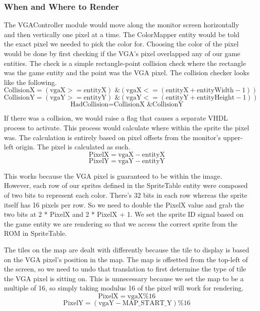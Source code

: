 \documentclass[10pt,a4paper]{article}
\begin{document}
\subsubsection{When and Where to Render}
The VGAController module would move along the monitor screen horizontally and then vertically one pixel at a time. The ColorMapper entity would be told the exact pixel we needed to pick the color for. Choosing the color of the pixel would be done by first checking if the VGA's pixel overlapped any of our game entities. The check is a simple rectangle-point collision check where the rectangle was the game entity and the point was the VGA pixel. The collision checker looks like the following.
\[ \mbox{CollisionX} = (\mbox{vgaX} >= \mbox{entityX}) \mbox{ \& } (\mbox{vgaX} <= (\mbox{entityX} + \mbox{entityWidth} - 1)) \]
\[ \mbox{CollisionY} = (\mbox{vgaY} >= \mbox{entityY}) \mbox{ \& } (\mbox{vgaY} <= (\mbox{entityY} + \mbox{entityHeight} - 1)) \]
\[ \mbox{HadCollision} = \mbox{CollisionX} \mbox{ \& } \mbox{CollisionY} \]

If there was a collision, we would raise a flag that causes a separate VHDL process to activate. This process would calculate where within the sprite the pixel was. The calculation is entirely based on pixel offsets from the monitor's upper-left origin. The pixel is calculated as such.
\[ \mbox{PixelX} = \mbox{vgaX} - \mbox{entityX} \]
\[ \mbox{PixelY} = \mbox{vgaY} - \mbox{entityY} \]

This works because the VGA pixel is guaranteed to be within the image. However, each row of our sprites defined in the SpriteTable entity were composed of two bits to represent each color. There's 32 bits in each row whereas the sprite itself has 16 pixels per row. So we need to double the PixelX value and grab the two bits at 2 * PixelX and 2 * PixelX + 1. We set the sprite ID signal based on the game entity we are rendering so that we access the correct sprite from the ROM in SpriteTable.

The tiles on the map are dealt with differently because the tile to display is based on the VGA pixel's position in the map. The map is offsetted from the top-left of the screen, so we need to undo that translation to first determine the type of tile the VGA pixel is sitting on. This is unnecessary because we set the map to be a multiple of 16, so simply taking modulus 16 of the pixel will work for rendering.
\[ \mbox{PixelX} = \mbox{vgaX} \% 16 \]
\[ \mbox{PixelY} = (\mbox{vgaY} - \mbox{MAP\_START\_Y}) \% 16 \]
\end{document}
